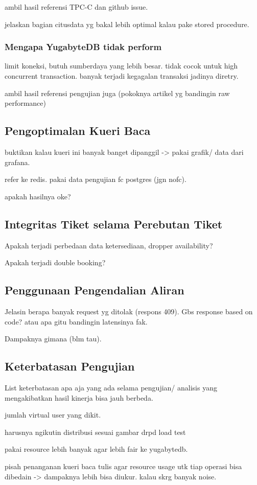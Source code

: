 ambil hasil referensi TPC-C dan github issue.

jelaskan bagian citusdata yg bakal lebih optimal kalau pake stored procedure.

\subsubsection{Mengapa YugabyteDB tidak perform}

limit koneksi, butuh sumberdaya yang lebih besar. tidak cocok untuk high concurrent transaction. banyak terjadi kegagalan transaksi jadinya diretry.

ambil hasil referensi pengujian juga (pokoknya artikel yg bandingin raw performance)

\subsection{Pengoptimalan Kueri Baca}

buktikan kalau kueri ini banyak banget dipanggil -> pakai grafik/ data dari grafana.  

refer ke redis. pakai data pengujian fc postgres (jgn nofc). 

apakah hasilnya oke?

\subsection{Integritas Tiket selama Perebutan Tiket}

Apakah terjadi perbedaan data ketersediaan, dropper availability?

Apakah terjadi double booking?

\subsection{Penggunaan Pengendalian Aliran}

Jelasin berapa banyak request yg ditolak (respons 409). Gbs response based on code? atau apa gitu bandingin latensinya fak.

Dampaknya gimana (blm tau).

\subsection{Keterbatasan Pengujian}

List keterbatasan apa aja yang ada selama pengujian/ analisis yang mengakibatkan hasil kinerja bisa jauh berbeda.

jumlah virtual user yang dikit.

harusnya ngikutin distribusi sesuai gambar drpd load test

pakai resource lebih banyak agar lebih fair ke yugabytedb.

pisah penanganan kueri baca tulis agar resource usage utk tiap operasi bisa dibedain -> dampaknya lebih bisa diukur. kalau skrg banyak noise.
